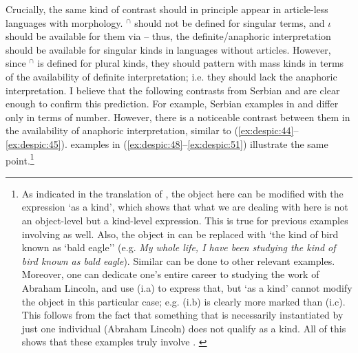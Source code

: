 \documentclass[output=paper,
modfonts
]{langscibook}
\begin{document}
	Crucially, the same kind of contrast should in principle appear in article-less languages with 
	morphology. $^\cap$ should not be defined for singular terms, and $\iota$ should be available for them via  -- thus, the definite/anaphoric interpretation should be available for singular kinds in languages without articles. However, since $^\cap$ is defined for plural kinds, they should pattern with mass kinds in terms of the availability of definite interpretation; i.e. they should lack the anaphoric interpretation. I believe that the following contrasts from Serbian and  are clear enough to confirm this prediction. For example, Serbian examples in  and  differ only in
	terms of number. However, there is a noticeable contrast between them in the availability of anaphoric interpretation, similar to (\ref{ex:despic:44}--\ref{ex:despic:45}).  examples in (\ref{ex:despic:48}--\ref{ex:despic:51}) illustrate the same point.\footnote{As indicated in the translation of , the object here can be modified with the expression `as a kind', which shows that what we are dealing with here is not an object-level but a kind-level expression. This is true for previous examples involving  as well. Also, the object in  can be replaced with `the kind of bird known as `bald eagle'' (e.g. \textit{My whole life, I have been studying the kind of bird known as bald eagle}). Similar can be done to other relevant examples. Moreover, one can dedicate one's entire career to studying the work of Abraham Lincoln, and use (i.a) to express that, but `as a kind' cannot modify the object in this particular case; e.g. (i.b) is clearly more marked than (i.c). This follows from the fact that something that is necessarily instantiated by just one individual (Abraham Lincoln) does not qualify as a kind. All of this shows that these examples truly involve .
		\ea \label{ex:despic:n10}
		\z 
		\z\vspace*{-\baselineskip} 
}
\end{document}
